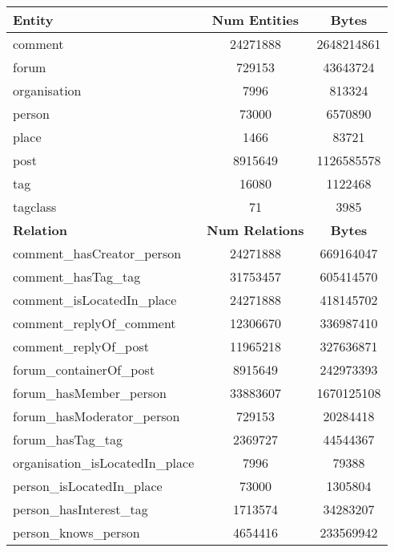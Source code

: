 \begin{table}[H]
    \centering
    \begin{tabular} {| l | c | c |}
        \hline
        \textbf{Entity} & \textbf{Num Entities} & \textbf{Bytes} \\
        \hline
        \hline
        comment & 24271888 & 2648214861 \\
        \hline
        forum & 729153 & 43643724 \\
        \hline
        organisation & 7996 & 813324 \\
        \hline
        person & 73000 & 6570890 \\
        \hline
        place & 1466 & 83721 \\
        \hline
        post & 8915649 & 1126585578 \\
        \hline
        tag & 16080 & 1122468 \\
        \hline
        tagclass & 71 & 3985 \\
        \hline
        \hline
        \textbf{Relation} & \textbf{Num Relations} & \textbf{Bytes} \\
        \hline
        \hline
        comment\_hasCreator\_person & 24271888 & 669164047 \\
        \hline
        comment\_hasTag\_tag & 31753457 & 605414570 \\
        \hline
        comment\_isLocatedIn\_place & 24271888 & 418145702 \\
        \hline
        comment\_replyOf\_comment & 12306670 & 336987410 \\
        \hline
        comment\_replyOf\_post & 11965218 & 327636871 \\
        \hline
        forum\_containerOf\_post & 8915649 & 242973393 \\
        \hline
        forum\_hasMember\_person & 33883607 & 1670125108 \\
        \hline
        forum\_hasModerator\_person & 729153 & 20284418 \\
        \hline
        forum\_hasTag\_tag & 2369727 & 44544367 \\
        \hline
        organisation\_isLocatedIn\_place & 7996 & 79388 \\
        \hline
        person\_isLocatedIn\_place & 73000 & 1305804 \\
        \hline
        person\_hasInterest\_tag & 1713574 & 34283207 \\
        \hline
        person\_knows\_person & 4654416 & 233569942 \\

\end{tabular}
\end{table}
